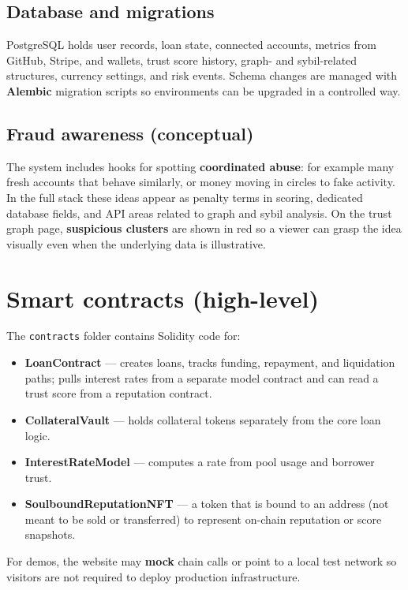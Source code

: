 \documentclass[11pt,a4paper]{article}
\begin{document}
\subsection{Database and migrations}
PostgreSQL holds user records, loan state, connected accounts, metrics from GitHub, Stripe, and wallets, trust score history, graph- and sybil-related structures, currency settings, and risk events. Schema changes are managed with \textbf{Alembic} migration scripts so environments can be upgraded in a controlled way.

\subsection{Fraud awareness (conceptual)}
The system includes hooks for spotting \textbf{coordinated abuse}: for example many fresh accounts that behave similarly, or money moving in circles to fake activity. In the full stack these ideas appear as penalty terms in scoring, dedicated database fields, and API areas related to graph and sybil analysis. On the trust graph page, \textbf{suspicious clusters} are shown in red so a viewer can grasp the idea visually even when the underlying data is illustrative.

\section{Smart contracts (high-level)}
The \texttt{contracts} folder contains Solidity code for:

\begin{itemize}[leftmargin=*]
  \item \textbf{LoanContract} --- creates loans, tracks funding, repayment, and liquidation paths; pulls interest rates from a separate model contract and can read a trust score from a reputation contract.
  \item \textbf{CollateralVault} --- holds collateral tokens separately from the core loan logic.
  \item \textbf{InterestRateModel} --- computes a rate from pool usage and borrower trust.
  \item \textbf{SoulboundReputationNFT} --- a token that is bound to an address (not meant to be sold or transferred) to represent on-chain reputation or score snapshots.
\end{itemize}

For demos, the website may \textbf{mock} chain calls or point to a local test network so visitors are not required to deploy production infrastructure.
\end{document}
